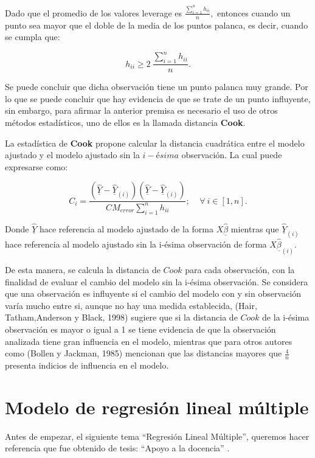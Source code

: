 \documentclass[
  a4paper,
  oneside,
  openany]{book}
\begin{document}
Dado que el promedio de los valores leverage es \(\frac{\sum_{i=1}^{n}h_{ii}}{n},\) entonces cuando un punto sea mayor que el doble de la media de los puntos palanca, es decir, cuando se cumpla que:

\[h_{ii} \geq  2 \ \frac{\sum_{i=1}^{n}h_{ii}}{n}.\]

Se puede concluir que dicha observación tiene un punto palanca muy grande. Por lo que se puede concluir que hay evidencia de que se trate de un punto influyente, sin embargo, para afirmar la anterior premisa es necesario el uso de otros métodos estadísticos, uno de ellos es la llamada distancia \textbf{Cook}.

La estadística de \textbf{Cook} propone calcular la distancia cuadrática entre el modelo ajustado y el modelo ajustado sin la \(i-ésima\) observación. La cual puede expresarse como:

\[C_{i}=\frac{\left(\underline{\hat{Y}}-\underline{\hat{Y}}_{(i)}\right)\left(\underline{\hat{Y}}-\underline{\hat{Y}}_{(i)}\right)}{CM_{error}\sum_{i=1}^{n}h_{ii}}; \ \ \ \ \  \forall \ i \in [1,n].\]

Donde \(\underline{\hat{Y}}\) hace referencia al modelo ajustado de la forma \(X\underline{\hat{\beta}}\) mientras que \(\underline{\hat{Y}}_{(i)}\) hace referencia al modelo ajustado sin la i-ésima observación de forma \(X\underline{\hat{\beta}}_{(i)}\).

De esta manera, se calcula la distancia de \(Cook\) para cada observación, con la finalidad de evaluar el cambio del modelo sin la i-ésima observación. Se considera que una observación es influyente si el cambio del modelo con y sin observación varía mucho entre si, aunque no hay una medida establecida, (Hair, Tatham,Anderson y Black, 1998) sugiere que si la distancia de \(Cook\) de la i-ésima observación es mayor o igual a 1 se tiene evidencia de que la observación analizada tiene gran influencia en el modelo, mientras que para otros autores como (Bollen y Jackman, 1985) mencionan que las distancias mayores que \(\frac{4}{n}\) presenta indicios de influencia en el modelo.

\hypertarget{modelo-de-regresiuxf3n-lineal-muxfaltiple}{%
\chapter{Modelo de regresión lineal múltiple}\label{modelo-de-regresiuxf3n-lineal-muxfaltiple}}

Antes de empezar, el siguiente tema ``Regresión Lineal Múltiple'', queremos hacer referencia que fue obtenido de tesis: ``Apoyo a la docencia'' \citet{Tesisdelicenciatura2019Estadistica}.
\end{document}

